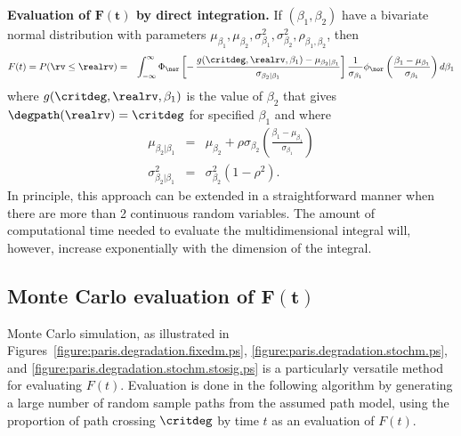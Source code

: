 \begin{algorithm}{\bfseries Evaluation
of $\boldsymbol{F(t)}$ by direct integration.}
\label{algorithm:evaluation.of.f.of.t.by.int} 
If $(\beta_{1}, \beta_{2})$ have a bivariate normal distribution
with parameters $\mu_{\beta_{1}},\mu_{\beta_{2}},
\sigma_{\beta_{1}}^{2}, \sigma_{\beta_{2}}^{2},
\rho_{\beta_{1},\beta_{2}}$,
then
\begin{eqnarray*}
F(t) = P(\rv \le \realrv) &=&
\int_{-\infty}^{\infty}
\Phi_{\nor}
\left [
-\, 
\frac{g(\critdeg, \realrv, \beta_{1})-\mu_{\beta_{2} | 
\beta_{1}}}
     {\sigma_{\beta_{2} | \beta_{1}}}
\right ]
\frac{1}{\sigma_{\beta_{1}}}
\phi_{\nor}  
\left (
\frac{\beta_{1} -\mu_{\beta_{1}}}
     {\sigma_{\beta_{1}}}
\right ) d\beta_{1}
\end{eqnarray*}
where $g(\critdeg, \realrv, \beta_{1})$ 
is the value of $\beta_{2}$ that gives $\degpath(\realrv)=\critdeg$
for specified $\beta_{1}$ and where
\begin{eqnarray*}
\mu_{\beta_{2} | \beta_{1}}&=&\mu_{\beta_{2}}+
\rho \sigma_{\beta_{2}}
\left (\frac{\beta_{1}-\mu_{\beta_{1}}}{\sigma_{\beta_{1}}}
\right)
\\
\sigma^{2}_{\beta_{2} | \beta_{1}}&=&\sigma_{\beta_{2}}^{2} (1-\rho^{2}).
\end{eqnarray*}
In principle, this approach can be extended in a straightforward
manner when there are more than 2 continuous random variables. The
amount of computational time needed to evaluate the multidimensional
integral will, however, increase exponentially with the dimension of
the integral.
\end{algorithm}

\subsection{Monte Carlo evaluation of $\boldsymbol{F(t)}$}
Monte Carlo simulation, as illustrated in
Figures~\ref{figure:paris.degradation.fixedm.ps},
\ref{figure:paris.degradation.stochm.ps}, 
and \ref{figure:paris.degradation.stochm.stosig.ps} is a particularly
versatile method for evaluating $F(t)$. Evaluation is done in the
following algorithm by generating a large number of random sample
paths from the assumed path model, using the proportion 
of path crossing
$\critdeg$ by time $t$ as an evaluation of $F(t)$.

